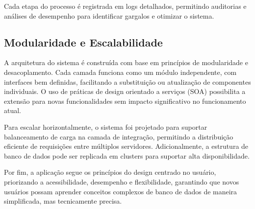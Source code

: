Cada etapa do processo é registrada em logs detalhados, permitindo auditorias e análises de desempenho para identificar gargalos e otimizar o sistema.

\subsection{Modularidade e Escalabilidade}
A arquitetura do sistema é construída com base em princípios de modularidade e desacoplamento. Cada camada funciona como um módulo independente, com interfaces bem definidas, facilitando a substituição ou atualização de componentes individuais. O uso de práticas de design orientado a serviços (SOA) possibilita a extensão para novas funcionalidades sem impacto significativo no funcionamento atual.

Para escalar horizontalmente, o sistema foi projetado para suportar balanceamento de carga na camada de integração, permitindo a distribuição eficiente de requisições entre múltiplos servidores. Adicionalmente, a estrutura de banco de dados pode ser replicada em clusters para suportar alta disponibilidade.

Por fim, a aplicação segue os princípios do design centrado no usuário, priorizando a acessibilidade, desempenho e flexibilidade, garantindo que novos usuários possam aprender conceitos complexos de banco de dados de maneira simplificada, mas tecnicamente precisa.


